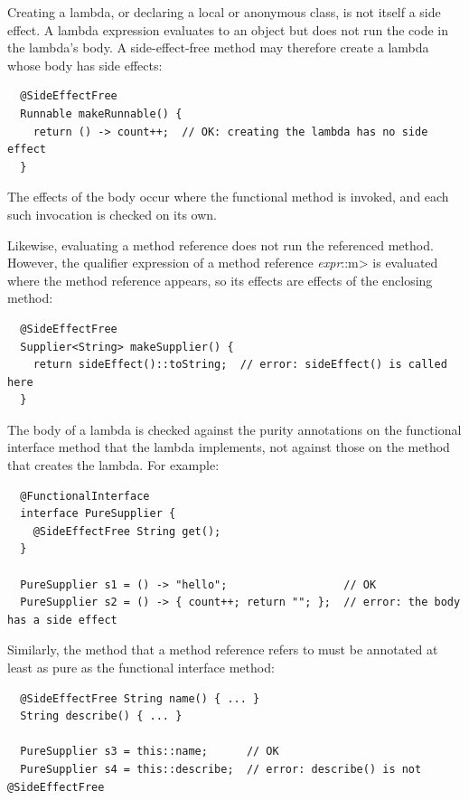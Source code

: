 
Creating a lambda, or declaring a local or anonymous class, is not itself a
side effect.  A lambda expression evaluates to an object but does not run the code
in the lambda's body.  A side-effect-free method may therefore create a lambda
whose body has side effects:

\begin{Verbatim}
  @SideEffectFree
  Runnable makeRunnable() {
    return () -> count++;  // OK: creating the lambda has no side effect
  }
\end{Verbatim}

\noindent
The effects of the body occur where the functional method is invoked, and
each such invocation is checked on its own.

Likewise, evaluating a method reference does not run the referenced method.
However, the qualifier expression of a method reference \<\emph{expr}::m>
is evaluated where the method reference appears, so its effects are effects
of the enclosing method:

\begin{Verbatim}
  @SideEffectFree
  Supplier<String> makeSupplier() {
    return sideEffect()::toString;  // error: sideEffect() is called here
  }
\end{Verbatim}

The body of a lambda is checked against the purity annotations on the
functional interface method that the lambda implements, not against those on
the method that creates the lambda.  For example:

\begin{Verbatim}
  @FunctionalInterface
  interface PureSupplier {
    @SideEffectFree String get();
  }

  PureSupplier s1 = () -> "hello";                  // OK
  PureSupplier s2 = () -> { count++; return ""; };  // error: the body has a side effect
\end{Verbatim}

\noindent
Similarly, the method that a method reference refers to must be annotated
at least as pure as the functional interface method:

\begin{Verbatim}
  @SideEffectFree String name() { ... }
  String describe() { ... }

  PureSupplier s3 = this::name;      // OK
  PureSupplier s4 = this::describe;  // error: describe() is not @SideEffectFree
\end{Verbatim}

